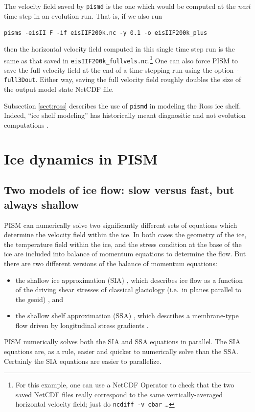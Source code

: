 \documentclass[11pt,final]{amsart}
\renewcommand{\t}[1]{\texttt{#1}}
\begin{document}
The velocity field saved by \verb|pismd| is the one which would be computed at the \emph{next} time step in an evolution run.  That is, if we also run

\verb|pisms -eisII F -if eisIIF200k.nc -y 0.1 -o eisIIF200k_plus|

\noindent then the horizontal velocity field computed in this single time step run is the same as that saved in \verb|eisIIF200k_fullvels.nc|.\footnote{For this example, one can use a NetCDF Operator to check that the two saved NetCDF files really correspond to the same vertically-averaged horizontal velocity field; just do \t{ncdiff -v cbar} \dots}  One can also force PISM to save the full velocity field at the end of a time-stepping run using the option \verb|-full3Dout|.  Either way, saving the full velocity field roughly doubles the size of the output model state NetCDF file.

Subsection \ref{sect:ross} describes the use of \verb|pismd| in modeling the Ross ice shelf.  Indeed, ``ice shelf modeling'' has historically meant diagnositic and not evolution computations \cite{MacAyealetal,HumbertGreveHutter}.




\clearpage
\newpage
\section{Ice dynamics in PISM}\label{sect:dynamics}

\subsection{Two models of ice flow: slow versus fast, but always shallow}  PISM can numerically solve two significantly different sets of equations which determine the velocity field within the ice.  In both cases the geometry of the ice, the temperature field within the ice, and the stress condition at the base of the ice are included into balance of momentum equations to determine the flow.  But there are two different versions of the balance of momentum equations:\begin{itemize}
\item the shallow ice approximation (SIA) \cite{Hutter}, which describes ice flow as a function of the driving shear stresses of classical glaciology (i.e.~in planes parallel to the geoid) \cite{Paterson}, and
\item the shallow shelf approximation (SSA) \cite{WeisGreveHutter}, which describes a membrane-type flow driven by longitudinal stress gradients \cite{Morland,MacAyeal,SchoofStream}.
\end{itemize}
PISM numerically solves both the SIA and SSA equations in parallel.  The SIA equations are, as a rule, easier and quicker to numerically solve than the SSA.  Certainly the SIA equations are easier to parallelize.
\end{document}
